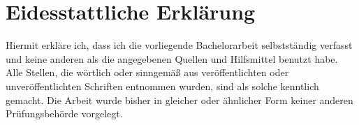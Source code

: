 \section{Eidesstattliche Erklärung}
Hiermit erkläre ich, dass ich die vorliegende Bachelorarbeit selbstständig verfasst und keine anderen als die angegebenen Quellen und Hilfsmittel benutzt habe. Alle Stellen, die wörtlich oder sinngemäß aus veröffentlichten oder unveröffentlichten Schriften entnommen wurden, sind als solche kenntlich gemacht. Die Arbeit wurde bisher in gleicher oder ähnlicher Form keiner anderen Prüfungsbehörde vorgelegt.
\newline
